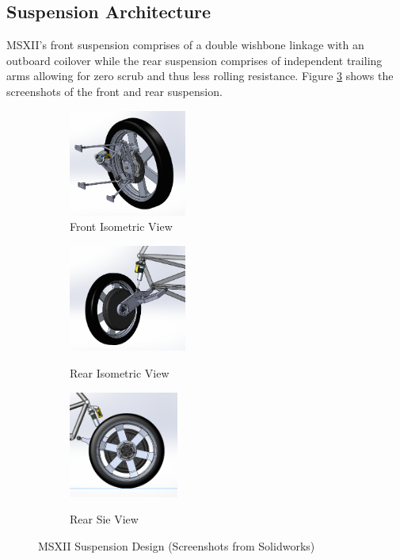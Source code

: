 \documentclass[12pt]{article}
\begin{document}
\subsection{Suspension Architecture}
MSXII's front suspension comprises of a double wishbone linkage with an outboard coilover while the rear suspension comprises of independent trailing arms allowing for zero scrub and thus less rolling resistance. Figure \ref{fig:solidworksScreenshots} shows the screenshots of the front and rear suspension.  
\begin{figure}[htbp]
	\centering
    \begin{subfigure}[b]{.32\textwidth}
		\caption{Front Isometric View}
		\centering
        \includegraphics[height=3.5cm]{./LaTex/frontIso.PNG}
    \end{subfigure}
    \begin{subfigure}[b]{.32\textwidth}
		\caption{Rear Isometric View}
		\centering
        \includegraphics[height=3.5cm]{./LaTex/rearIso.PNG}
        \label{fig:c8}
    \end{subfigure}
    \begin{subfigure}[b]{.32\textwidth}
		\caption{Rear Sie View}
		\centering
        \includegraphics[height=3.5cm]{./LaTex/rearRight.PNG}
        \label{fig:c9}
    \end{subfigure}
    \caption{MSXII Suspension Design (Screenshots from Solidworks)}
	\label{fig:solidworksScreenshots}
\end{figure}
	
\end{document}
